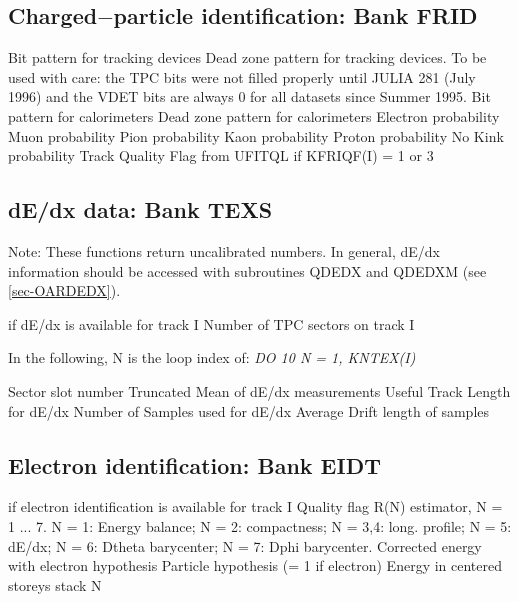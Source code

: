 \subsection{\label{sec-TVAFRID}Charged$-$particle identification:
Bank FRID}
\par
\begin{indentlist}{ 3.00cm}{ 3.25cm}
Bit pattern for tracking devices
Dead zone pattern for tracking devices. To be used with care: the TPC bits were
not filled properly until JULIA 281 (July 1996) and the VDET bits are always 0 for all datasets since Summer 1995.
Bit pattern for calorimeters
Dead zone pattern for calorimeters
Electron probability
Muon probability
Pion probability
Kaon probability
Proton probability
No Kink probability
Track Quality Flag from UFITQL
 if KFRIQF(I) = 1 or 3
\end{indentlist}
 
\subsection{\label{sec-TVATEXS}dE/dx data: Bank TEXS}
\par
Note: These functions return uncalibrated numbers. In general,
dE/dx information should be accessed with subroutines QDEDX and
QDEDXM (see \ref{sec-OARDEDX}).
\begin{indentlist}{ 3.00cm}{ 3.25cm}
 if dE/dx is available for track
I
Number of TPC sectors on track I
\end{indentlist}
In the following, N is
the loop index of: {\it DO 10 N = 1, KNTEX(I)}
\begin{indentlist}{ 3.00cm}{ 3.25cm}
Sector slot number
Truncated Mean of dE/dx measurements
Useful Track Length for dE/dx
Number of Samples used for dE/dx
Average Drift length of samples
\end{indentlist}
 
\subsection{\label{sec-TVAEIDT}Electron identification: Bank EIDT}
\par
\begin{indentlist}{ 3.00cm}{ 3.25cm}
if electron identification is available for track I
Quality flag
R(N) estimator, N = 1 ... 7.
N = 1: Energy balance; N = 2: compactness;
N = 3,4: long. profile; N = 5: dE/dx; N = 6: Dtheta barycenter;
N = 7: Dphi barycenter.
Corrected energy with electron hypothesis
Particle hypothesis (= 1 if electron)
Energy in centered storeys stack N
\end{indentlist}
 
